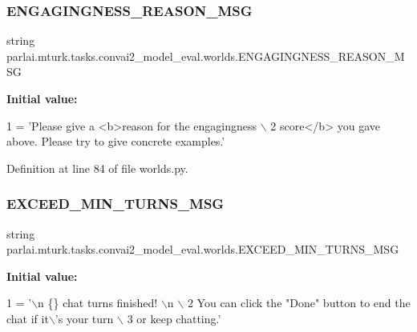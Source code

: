 \subsubsection{\texorpdfstring{E\+N\+G\+A\+G\+I\+N\+G\+N\+E\+S\+S\+\_\+\+R\+E\+A\+S\+O\+N\+\_\+\+M\+SG}{ENGAGINGNESS\_REASON\_MSG}}
{\footnotesize\ttfamily string parlai.\+mturk.\+tasks.\+convai2\+\_\+model\+\_\+eval.\+worlds.\+E\+N\+G\+A\+G\+I\+N\+G\+N\+E\+S\+S\+\_\+\+R\+E\+A\+S\+O\+N\+\_\+\+M\+SG}

{\bfseries Initial value\+:}
\begin{DoxyCode}
1 =  \textcolor{stringliteral}{'Please give a <b>reason for the engagingness \(\backslash\)}
2 \textcolor{stringliteral}{        score</b> you gave above. Please try to give concrete examples.'}
\end{DoxyCode}


Definition at line 84 of file worlds.\+py.

\mbox{\label{namespaceparlai_1_1mturk_1_1tasks_1_1convai2__model__eval_1_1worlds_a5e21bdfb814efe46d22b8cd1b4426270}} 
\subsubsection{\texorpdfstring{E\+X\+C\+E\+E\+D\+\_\+\+M\+I\+N\+\_\+\+T\+U\+R\+N\+S\+\_\+\+M\+SG}{EXCEED\_MIN\_TURNS\_MSG}}
{\footnotesize\ttfamily string parlai.\+mturk.\+tasks.\+convai2\+\_\+model\+\_\+eval.\+worlds.\+E\+X\+C\+E\+E\+D\+\_\+\+M\+I\+N\+\_\+\+T\+U\+R\+N\+S\+\_\+\+M\+SG}

{\bfseries Initial value\+:}
\begin{DoxyCode}
1 =  \textcolor{stringliteral}{'\(\backslash\)n \{\} chat turns finished! \(\backslash\)n \(\backslash\)}
2 \textcolor{stringliteral}{        You can click the "Done" button to end the chat if it\(\backslash\)'s your turn \(\backslash\)}
3 \textcolor{stringliteral}{        or keep chatting.'}
\end{DoxyCode}


